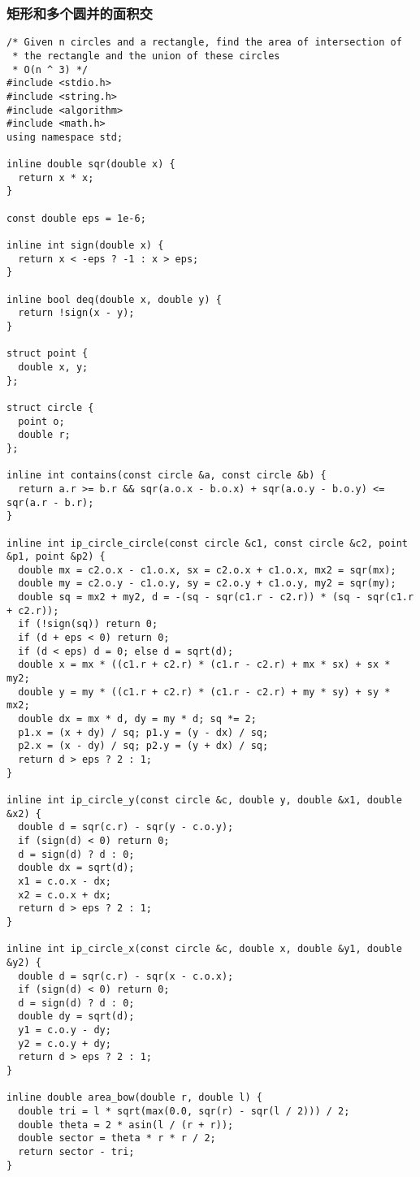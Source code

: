 \subsubsection{矩形和多个圆并的面积交}
\begin{verbatim}
/* Given n circles and a rectangle, find the area of intersection of 
 * the rectangle and the union of these circles 
 * O(n ^ 3) */
#include <stdio.h>
#include <string.h>
#include <algorithm>
#include <math.h>
using namespace std;

inline double sqr(double x) {
  return x * x;
}

const double eps = 1e-6;

inline int sign(double x) {
  return x < -eps ? -1 : x > eps;
}

inline bool deq(double x, double y) {
  return !sign(x - y);
}

struct point {
  double x, y;
};

struct circle {
  point o;
  double r;
};

inline int contains(const circle &a, const circle &b) {
  return a.r >= b.r && sqr(a.o.x - b.o.x) + sqr(a.o.y - b.o.y) <= sqr(a.r - b.r);
}

inline int ip_circle_circle(const circle &c1, const circle &c2, point &p1, point &p2) {
  double mx = c2.o.x - c1.o.x, sx = c2.o.x + c1.o.x, mx2 = sqr(mx);
  double my = c2.o.y - c1.o.y, sy = c2.o.y + c1.o.y, my2 = sqr(my);
  double sq = mx2 + my2, d = -(sq - sqr(c1.r - c2.r)) * (sq - sqr(c1.r + c2.r));
  if (!sign(sq)) return 0;
  if (d + eps < 0) return 0;
  if (d < eps) d = 0; else d = sqrt(d);
  double x = mx * ((c1.r + c2.r) * (c1.r - c2.r) + mx * sx) + sx * my2;
  double y = my * ((c1.r + c2.r) * (c1.r - c2.r) + my * sy) + sy * mx2;
  double dx = mx * d, dy = my * d; sq *= 2;
  p1.x = (x + dy) / sq; p1.y = (y - dx) / sq;
  p2.x = (x - dy) / sq; p2.y = (y + dx) / sq;
  return d > eps ? 2 : 1;
}

inline int ip_circle_y(const circle &c, double y, double &x1, double &x2) {
  double d = sqr(c.r) - sqr(y - c.o.y);
  if (sign(d) < 0) return 0;
  d = sign(d) ? d : 0;
  double dx = sqrt(d);
  x1 = c.o.x - dx;
  x2 = c.o.x + dx;
  return d > eps ? 2 : 1;
}

inline int ip_circle_x(const circle &c, double x, double &y1, double &y2) {
  double d = sqr(c.r) - sqr(x - c.o.x);
  if (sign(d) < 0) return 0;
  d = sign(d) ? d : 0;
  double dy = sqrt(d);
  y1 = c.o.y - dy;
  y2 = c.o.y + dy;
  return d > eps ? 2 : 1;
}

inline double area_bow(double r, double l) {
  double tri = l * sqrt(max(0.0, sqr(r) - sqr(l / 2))) / 2;
  double theta = 2 * asin(l / (r + r));
  double sector = theta * r * r / 2;
  return sector - tri;
}


\end{verbatim}
